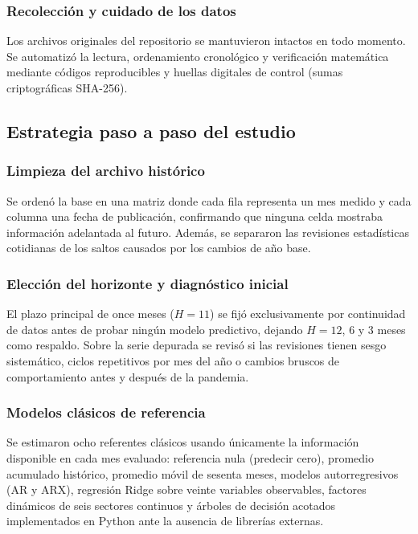 \subsubsection{Recolección y cuidado de los datos}

Los archivos originales del repositorio se mantuvieron intactos en todo momento. Se automatizó la lectura, ordenamiento cronológico y verificación matemática mediante códigos reproducibles y huellas digitales de control (sumas criptográficas SHA-256).

\subsection{Estrategia paso a paso del estudio}

\subsubsection{Limpieza del archivo histórico}

Se ordenó la base en una matriz donde cada fila representa un mes medido y cada columna una fecha de publicación, confirmando que ninguna celda mostraba información adelantada al futuro. Además, se separaron las revisiones estadísticas cotidianas de los saltos causados por los cambios de año base.

\subsubsection{Elección del horizonte y diagnóstico inicial}

El plazo principal de once meses (\(H=11\)) se fijó exclusivamente por continuidad de datos antes de probar ningún modelo predictivo, dejando \(H=12\), \(6\) y \(3\) meses como respaldo. Sobre la serie depurada se revisó si las revisiones tienen sesgo sistemático, ciclos repetitivos por mes del año o cambios bruscos de comportamiento antes y después de la pandemia.

\subsubsection{Modelos clásicos de referencia}

Se estimaron ocho referentes clásicos usando únicamente la información disponible en cada mes evaluado: referencia nula (predecir cero), promedio acumulado histórico, promedio móvil de sesenta meses, modelos autorregresivos (AR y ARX), regresión Ridge sobre veinte variables observables, factores dinámicos de seis sectores continuos y árboles de decisión acotados implementados en Python ante la ausencia de librerías externas.

